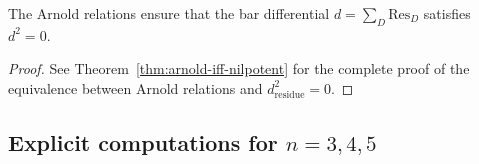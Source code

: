 \begin{corollary}
\label{cor:nilpotency-arnold-comprehensive}
The Arnold relations ensure that the bar differential $d = \sum_{D} \text{Res}_D$
satisfies $d^2 = 0$.
\end{corollary}

\begin{proof}
See Theorem~\ref{thm:arnold-iff-nilpotent} for the complete proof of the equivalence between Arnold relations and $d_{\mathrm{residue}}^2 = 0$.
\end{proof}

\subsection{\texorpdfstring{Explicit computations for $n = 3, 4, 5$}{Explicit computations for n = 3, 4, 5}}
\label{sec:arnold-explicit-n2345}

